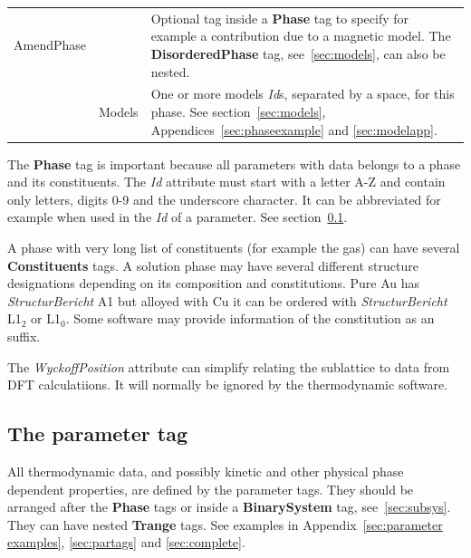 \documentclass{article}
\begin{document}
\begin{tabular}{|p{} p{} p{}|}
  AmendPhase & & Optional tag inside a {\bf Phase} tag to specify 
                 for example a contribution due to a magnetic model.
                 The {\bf DisorderedPhase} tag, see~\ref{sec:models}, can
                 also be nested.\\
        & Models & One or more models {\em Id}s, separated by a space, for this
                  phase.  See section~\ref{sec:models},
                  Appendices~\ref{sec:phaseexample} and
                  \ref{sec:modelapp}.\\\hline

\end{tabular}

\bigskip

The {\bf Phase} tag is important because all parameters with data
belongs to a phase and its constituents.  The {\em Id} attribute must
start with a letter A-Z and contain only letters, digits 0-9 and the
underscore character.  It can be abbreviated for example when used in
the {\em Id} of a parameter.  See section~\ref{sec:parametertag}.

A phase with very long list of constituents (for example the gas) can
have several {\bf Constituents} tags.  A solution phase may have
several different structure designations depending on its composition
and constitutions.  Pure Au has {\em StructurBericht} A1 but alloyed
with Cu it can be ordered with {\em StructurBericht} L1$_2$ or L1$_0$.
Some software may provide information of the constitution as an
suffix.

The {\em WyckoffPosition} attribute can simplify relating the
sublattice to data from DFT calculatiions.  It will normally be ignored
by the thermodynamic software.

\newpage

\subsection{The parameter tag}\label{sec:parametertag}

All thermodynamic data, and possibly kinetic and other physical phase
dependent properties, are defined by the parameter tags.  They should
be arranged after the {\bf Phase} tags or inside a {\bf BinarySystem}
tag, see~\ref{sec:subsys}.  They can have nested {\bf Trange} tags.
See examples in Appendix~\ref{sec:parameter examples},
\ref{sec:partags} and \ref{sec:complete}.
\end{document}
